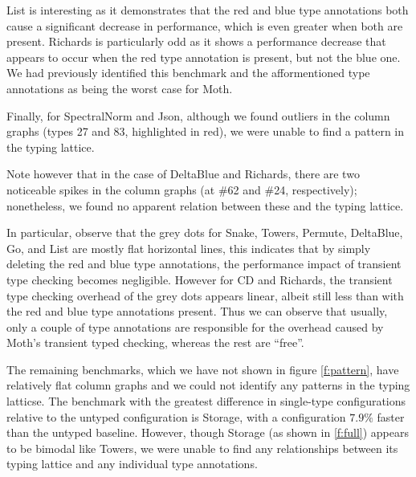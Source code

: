 \documentclass[sigplan,10pt,review,screen]{acmart}\settopmatter{printfolios=true}
\begin{document}
List is interesting as it demonstrates that the red and blue type annotations both cause a significant decrease in performance, which is even greater when both are present. Richards is particularly odd as it shows a performance decrease that appears to occur when the red type annotation is present, but not the blue one. We had previously identified this benchmark and the afformentioned type annotations \cite{roberts-and-co-ecoop-2019} as being the worst case for Moth.

Finally, for SpectralNorm and Json, although we found outliers in the column graphs (types 27 and 83, highlighted in red), we were unable to find a pattern in the typing lattice.

Note however that in the case of DeltaBlue and Richards, there are two noticeable spikes in the column graphs (at \#62 and \#24, respectively); nonetheless, we found no apparent relation between these and the typing lattice.

In particular, observe that the grey dots for Snake, Towers, Permute, DeltaBlue, Go, and List are mostly flat horizontal lines, this indicates that by simply deleting the red and blue type annotations, the performance impact of transient type checking becomes negligible. However for CD and Richards, the transient type checking overhead of the grey dots appears linear, albeit still less than with the red and blue type annotations present. Thus we can observe that usually, only a couple of type annotations are responsible for the overhead caused by Moth's transient typed checking, whereas the rest are ``free''.

The remaining benchmarks, which we have not shown in figure \ref{f:pattern}, have relatively flat column graphs and we could not identify any patterns in the typing latticse. The benchmark with the greatest difference in single-type configurations relative to the untyped configuration is Storage, with a configuration $7.9\%$ faster than the untyped baseline. However, though Storage (as shown in \ref{f:full}) appears to be bimodal like Towers, we were unable to find any relationships between its typing lattice and any individual type annotations.
\end{document}
